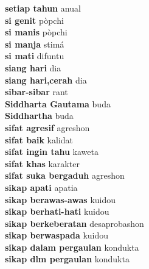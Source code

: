 \textbf{ setiap tahun  } anual \\
\textbf{ si genit  } pòpchi \\
\textbf{ si manis  } pòpchi \\
\textbf{ si manja  } stimá \\
\textbf{ si mati  } difuntu \\
\textbf{ siang hari  } dia \\
\textbf{ siang hari,cerah  } dia \\
\textbf{ sibar-sibar  } rant \\
\textbf{ Siddharta Gautama  } buda \\
\textbf{ Siddhartha  } buda \\
\textbf{ sifat agresif  } agreshon \\
\textbf{ sifat baik  } kalidat \\
\textbf{ sifat ingin tahu  } kaweta \\
\textbf{ sifat khas  } karakter \\
\textbf{ sifat suka bergaduh  } agreshon \\
\textbf{ sikap apati  } apatia \\
\textbf{ sikap berawas-awas  } kuidou \\
\textbf{ sikap berhati-hati  } kuidou \\
\textbf{ sikap berkeberatan  } desaprobashon \\
\textbf{ sikap berwaspada  } kuidou \\
\textbf{ sikap dalam pergaulan  } kondukta \\
\textbf{ sikap dlm pergaulan  } kondukta \\
